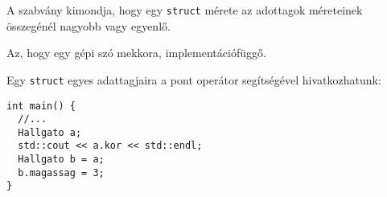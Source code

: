 \documentclass[../cpp_book/cpp_book.tex]{subfiles}
\begin{document}
	A szabvány kimondja, hogy egy \texttt{struct} mérete az adottagok méreteinek összegénél nagyobb vagy egyenlő.
	\smallskip
	
	Az, hogy egy gépi szó mekkora, implementációfüggő.
	\bigskip
	
	Egy \texttt{struct} egyes adattagjaira a pont operátor segítségével hivatkozhatunk:
	\begin{lstlisting}
int main() {
  //...
  Hallgato a;
  std::cout << a.kor << std::endl;
  Hallgato b = a;
  b.magassag = 3;
}
	\end{lstlisting}      
	
\end{document}
